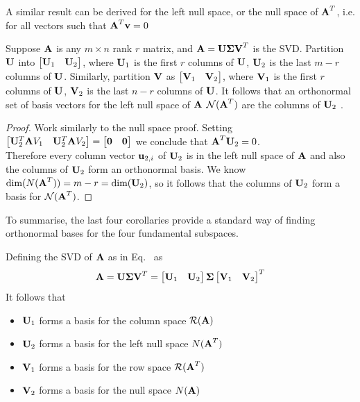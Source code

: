 \documentclass[a4paper]{article}
\numberwithin{equation}{section} %
\newcommand{\fancyN}{\mathcal{N}} %
\newcommand{\B}[1]{\textbf{\textup{#1}}} %
\renewcommand{\eqref}{Eq.~\originaleqref}
\renewcommand*{\eqref}[1]{Eq.~\originaleqref{#1}}
\begin{document}
A similar result can be derived for the left null space, or the null space of $\B{A}^T$, i.e. for all vectors such that $\B{A}^T\B{v}=0$
\begin{corollary}
Suppose $\B{A}$ is any $m \times n$    rank $r$ matrix, and $\B{A}=\B{U}\boldsymbol{\Sigma}\B{V}^T$ is the SVD.  Partition $\B{U}$ into $\begin{bmatrix}\B{U}_1&  \B{U}_2 \end{bmatrix}$, where $\B{U}_1 $ is the first $r$ columns of $\B{U}$, $\B{U}_2$ is the last $m-r$ columns of $\B{U}$.  Similarly, partition $\B{V}$ as $\begin{bmatrix}\B{V}_1 & \B{V}_2 \end{bmatrix}$, where $\B{V}_1 $ is the first $r$ columns of $\B{U}$, $\B{V}_2$ is the last $n-r$ columns of $\B{U}$.  It follows that an orthonormal set of basis vectors for the left null space of $\B{A}$ $\fancyN(\B{A}^T)$  are the columns of $\B{U}_2$ \cite{lec_notes_hyde}.
\end{corollary}
\begin{proof}
Work similarly to the null space proof. Setting $\begin{bmatrix} \mathbf{U}_{2}^{T}\mathbf{A}{{V}_{1}} & \mathbf{U}_{2}^{T}\mathbf{A}{{V}_{2}} \end{bmatrix} = \begin{bmatrix}\B{0} & \B{0} \end{bmatrix}$ we conclude that $\B{A}^T\B{U}_2 = 0$.\\
Therefore every column vector $\B{u}_{2,i}$ of $\B{U}_2$ is in the left null space of $\B{A}$ and also the columns of $\B{U}_2$ form an orthonormal basis. We know $\textup{dim}(N(\B{A}^T)) = m - r = \textup{dim}(\B{U}_2)$, so it follows that the columns of $\B{U}_2$ form a basis for $\fancyN(\B{A}^T)$.
\end{proof}
To summarise, the last four corollaries provide a standard way of finding orthonormal bases for the four fundamental subspaces.
\begin{shaded*}
\begin{theorem}
Defining the SVD of $\B{A}$ as in \eqref{eq:svd_compact} as
\[
\B{A}=\B{U}\boldsymbol{\Sigma}\B{V}^T= 
\begin{bmatrix}\B{U}_1 & \B{U}_2 \end{bmatrix}\boldsymbol{\Sigma}\begin{bmatrix}\B{V}_1 & \B{V}_2 \end{bmatrix}^T
\]
It follows that
\begin{itemize}
\item $\B{U}_1$ forms a basis for the column space $\mathcal{R}(\B{A})$
\item $\B{U}_2$ forms a basis for the left null space $N(\B{A}^T)$
\item $\B{V}_1$ forms a basis for the row space $\mathcal{R}(\B{A}^T)$
\item $\B{V}_2$ forms a basis for the null space $N(\B{A})$
\end{itemize}

\end{theorem}
\end{shaded*}
\end{document}
